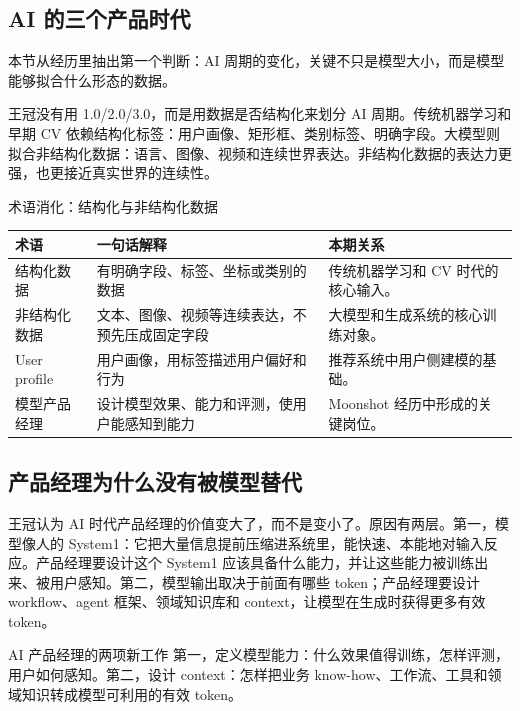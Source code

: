 \documentclass[a4paper]{article}
\begin{document}
\subsection{AI 的三个产品时代}

本节从经历里抽出第一个判断：AI 周期的变化，关键不只是模型大小，而是模型能够拟合什么形态的数据。

王冠没有用 1.0/2.0/3.0，而是用数据是否结构化来划分 AI 周期。传统机器学习和早期 CV 依赖结构化标签：用户画像、矩形框、类别标签、明确字段。大模型则拟合非结构化数据：语言、图像、视频和连续世界表达。非结构化数据的表达力更强，也更接近真实世界的连续性。

\begin{knowledgebox}{术语消化：结构化与非结构化数据}
\begin{tabularx}{\textwidth}{p{}p{}X}
\toprule
术语 & 一句话解释 & 本期关系 \\
\midrule
结构化数据 & 有明确字段、标签、坐标或类别的数据 & 传统机器学习和 CV 时代的核心输入。 \\
非结构化数据 & 文本、图像、视频等连续表达，不预先压成固定字段 & 大模型和生成系统的核心训练对象。 \\
User profile & 用户画像，用标签描述用户偏好和行为 & 推荐系统中用户侧建模的基础。 \\
模型产品经理 & 设计模型效果、能力和评测，使用户能感知到能力 & Moonshot 经历中形成的关键岗位。 \\
\bottomrule
\end{tabularx}
\end{knowledgebox}

\subsection{产品经理为什么没有被模型替代}

王冠认为 AI 时代产品经理的价值变大了，而不是变小了。原因有两层。第一，模型像人的 System1：它把大量信息提前压缩进系统里，能快速、本能地对输入反应。产品经理要设计这个 System1 应该具备什么能力，并让这些能力被训练出来、被用户感知。第二，模型输出取决于前面有哪些 token；产品经理要设计 workflow、agent 框架、领域知识库和 context，让模型在生成时获得更多有效 token。

\begin{importantbox}{AI 产品经理的两项新工作}
第一，定义模型能力：什么效果值得训练，怎样评测，用户如何感知。第二，设计 context：怎样把业务 know-how、工作流、工具和领域知识转成模型可利用的有效 token。
\end{importantbox}
\end{document}
